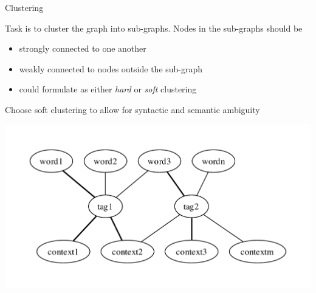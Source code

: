 \documentclass{beamer}
\begin{document}
\begin{frame}[t]{Clustering}

Task is to cluster the graph into sub-graphs. Nodes in the sub-graphs should be
\begin{itemize}
\item strongly connected to one another
\item weakly connected to nodes outside the sub-graph
\item could formulate as either \emph{hard} or \emph{soft} clustering
\end{itemize}
Choose \alert{soft clustering} to allow for syntactic and semantic ambiguity

\centering
\includegraphics[width=0.7\columnwidth]{bipartite_lda.pdf}

\end{frame}
\end{document}
